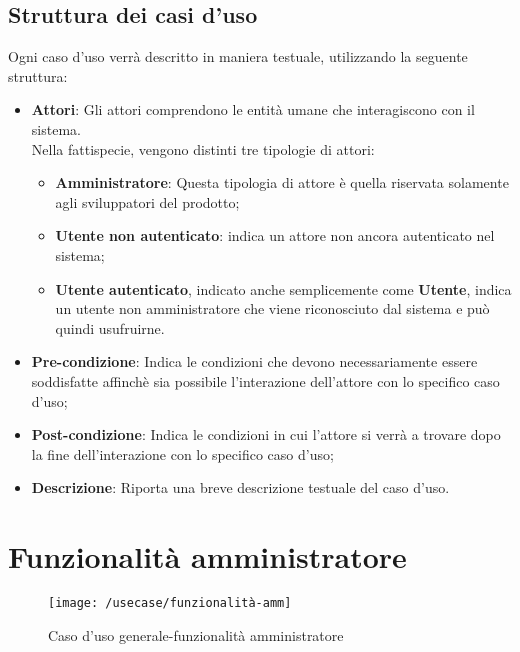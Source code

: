 \subsection{Struttura dei casi d'uso}
Ogni caso d'uso verrà descritto in maniera testuale, utilizzando la seguente struttura:
\begin{itemize}
	\item \textbf{Attori}: Gli attori comprendono le entità umane che interagiscono con il sistema. \\ 
	Nella fattispecie, vengono distinti tre tipologie di attori:
	\begin{itemize}
		\item \textbf{Amministratore}: Questa tipologia di attore è quella riservata solamente agli sviluppatori del prodotto;
		\item \textbf{Utente non autenticato}: indica un attore non ancora autenticato nel sistema;
		\item \textbf{Utente autenticato}, indicato anche semplicemente come \textbf{Utente}, indica un utente non amministratore che viene riconosciuto dal sistema e può quindi usufruirne.
	\end{itemize}
	\item \textbf{Pre-condizione}: Indica le condizioni che devono necessariamente essere soddisfatte affinchè sia possibile l'interazione dell'attore con lo specifico caso d'uso;
	\item \textbf{Post-condizione}: Indica le condizioni in cui l'attore si verrà a trovare dopo la fine dell'interazione con lo specifico caso d'uso;
	\item \textbf{Descrizione}: Riporta una breve descrizione testuale del caso d'uso.
\end{itemize}
\section{Funzionalità amministratore}
\begin{figure}[h]
	\centering
	\texttt{[image: /usecase/funzionalità-amm]}
	\caption{Caso d'uso generale-funzionalità amministratore}
\end{figure}
